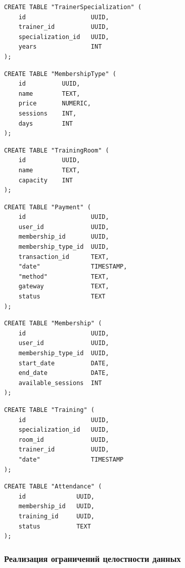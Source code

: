 \newpage
\begin{lstlisting}[label=alg:4, caption=Реализация создания отношения TrainerSpecialization, captionpos=t]
CREATE TABLE "TrainerSpecialization" (
	id 					UUID,
	trainer_id			UUID,
	specialization_id	UUID,
	years				INT
);
\end{lstlisting}

\begin{lstlisting}[label=alg:5, caption=Реализация создания отношения MembershipType, captionpos=t]
CREATE TABLE "MembershipType" (
	id 			UUID,
	name 		TEXT,
	price 		NUMERIC,
	sessions	INT,
	days		INT
);
\end{lstlisting}

\begin{lstlisting}[label=alg:6, caption=Реализация создания отношения TrainingRoom, captionpos=t]
CREATE TABLE "TrainingRoom" (
	id			UUID,
	name	 	TEXT,
	capacity 	INT
);
\end{lstlisting}

\begin{lstlisting}[label=alg:9, caption=Реализация создания отношения Payment, captionpos=t]
CREATE TABLE "Payment" (
	id					UUID,
	user_id				UUID,
	membership_id		UUID,
	membership_type_id	UUID,
	transaction_id 		TEXT,
	"date" 				TIMESTAMP,
	"method" 			TEXT,
	gateway 			TEXT,
	status 				TEXT
);
\end{lstlisting}

\newpage
\begin{lstlisting}[label=alg:10, caption=Реализация создания отношенияMembership, captionpos=t]
CREATE TABLE "Membership" (
	id 					UUID,
	user_id				UUID,
	membership_type_id	UUID,
	start_date			DATE,
	end_date			DATE,
	available_sessions	INT
);
\end{lstlisting}

\begin{lstlisting}[label=alg:11, caption=Реализация создания отношения Training, captionpos=t]
CREATE TABLE "Training" (
	id 					UUID,
	specialization_id	UUID,
	room_id				UUID,
	trainer_id			UUID,
	"date"				TIMESTAMP
);
\end{lstlisting}

\begin{lstlisting}[label=alg:12, caption=Реализация создания отношения Attendance, captionpos=t]
	CREATE TABLE "Attendance" (
	id 				UUID,
	membership_id	UUID,
	training_id		UUID,
	status			TEXT
);
\end{lstlisting}


\subsubsection*{Реализация ограничений целостности данных}

